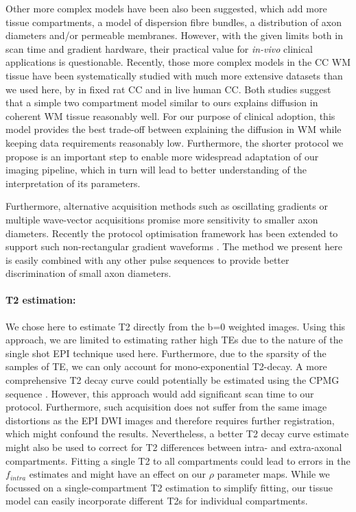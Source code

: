 Other more complex models have been also been suggested, which add more tissue compartments, a model of dispersion fibre bundles, a distribution of axon diameters and/or permeable membranes. However, with the given limits both in scan time and gradient hardware, their practical value for \emph{in-vivo} clinical applications is questionable. Recently, those more complex models in the \gls{CC} WM tissue have been systematically studied with much more extensive datasets than we used here, by \citet{Panagiotaki:2012} in fixed rat \gls{CC} and \citet{Ferizi:2012} in live human \gls{CC}. Both studies suggest that a simple two compartment model similar to ours explains diffusion in coherent WM tissue reasonably well. For our purpose of clinical adoption, this model provides the best trade-off between explaining the diffusion in WM while keeping data requirements reasonably low. Furthermore, the shorter protocol we propose is an important step to enable more widespread adaptation of our imaging pipeline, which in turn will lead to better understanding of the interpretation of its parameters.


Furthermore, alternative acquisition methods such as oscillating gradients \citep{Does:2003, Colvin:2008} or multiple wave-vector acquisitions \citep{Komlosh:2008,Koch:2008,Avram:2012} promise more sensitivity to smaller axon diameters. Recently the protocol optimisation framework has been extended to support such non-rectangular gradient waveforms \citep{Drobnjak:2010,Siow:2012a}. The method we present here is easily combined with any other pulse sequences to provide better discrimination of small axon diameters.

\paragraph{T2 estimation: } We chose here to estimate T2 directly from the b=0 weighted images. Using this approach, we are limited to estimating rather high \glspl{TE} due to the nature of the single shot EPI technique used here. Furthermore, due to the sparsity of the samples of \gls{TE}, we can only account for mono-exponential T2-decay. A more comprehensive T2 decay curve could potentially be estimated using the \gls{CPMG} sequence \citep{Pell:2006}. However, this approach would add significant scan time to our protocol. Furthermore, such acquisition does not suffer from the same image distortions as the EPI DWI images and therefore requires further registration, which might confound the results. Nevertheless, a better T2 decay curve estimate might also be used to correct for T2 differences between intra- and extra-axonal compartments. Fitting a single T2 to all compartments could lead to errors in  the $f_{intra}$ estimates and might have an effect on our $\rho$ parameter maps. While we focussed on a single-compartment T2 estimation to simplify fitting, our tissue model can easily incorporate different T2s for individual compartments. 

